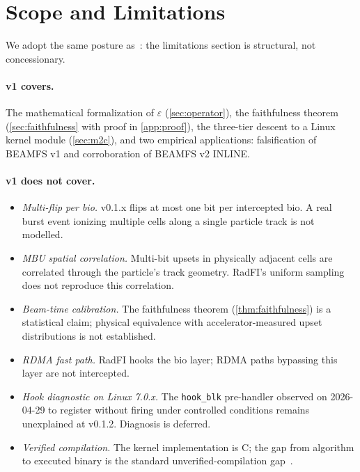 \section{Scope and Limitations}\label{sec:limitations}

We adopt the same posture as~\cite{desbrieres2026beamfsv1}: the
limitations section is structural, not concessionary.

\paragraph{v1 covers.}
The mathematical formalization of \(\varepsilon\)
(\cref{sec:operator}), the faithfulness theorem
(\cref{sec:faithfulness} with proof in \cref{app:proof}), the
three-tier descent to a Linux kernel module (\cref{sec:m2c}), and
two empirical applications: falsification of BEAMFS v1 and
corroboration of BEAMFS v2 INLINE.

\paragraph{v1 does not cover.}

\begin{itemize}
\item \emph{Multi-flip per bio.} v0.1.x flips at most one bit per
  intercepted bio. A real burst event ionizing multiple cells along
  a single particle track is not modelled.
\item \emph{MBU spatial correlation.} Multi-bit upsets in physically
  adjacent cells are correlated through the particle's track
  geometry. RadFI's uniform sampling does not reproduce this
  correlation.
\item \emph{Beam-time calibration.} The faithfulness theorem
  (\cref{thm:faithfulness}) is a statistical claim; physical
  equivalence with accelerator-measured upset distributions is not
  established.
\item \emph{RDMA fast path.} RadFI hooks the bio layer; RDMA paths
  bypassing this layer are not intercepted.
\item \emph{Hook diagnostic on Linux 7.0.x.} The \texttt{hook\_blk}
  pre-handler observed on 2026-04-29 to register without firing
  under controlled conditions remains unexplained at v0.1.2.
  Diagnosis is deferred.
\item \emph{Verified compilation.} The kernel implementation is C;
  the gap from algorithm to executed binary is the standard
  unverified-compilation gap~\cite{klein2009sel4}.
\end{itemize}

